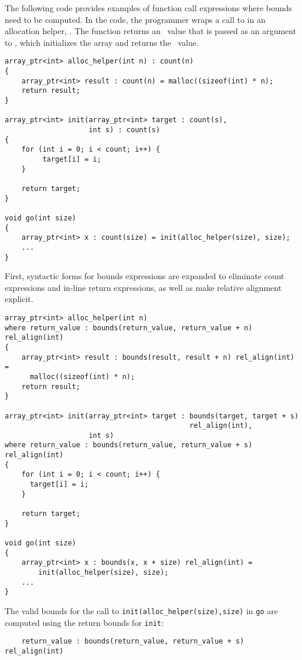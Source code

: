The following code provides examples of function call expressions where
bounds need to be computed. In the code, the programmer wraps a call to
 in an allocation helper, . The
function  returns an \arrayptr\ value
that is passed as an argument to , which initializes the array
and returns the \arrayptr\ value.
\begin{lstlisting}
array_ptr<int> alloc_helper(int n) : count(n)
{
    array_ptr<int> result : count(n) = malloc((sizeof(int) * n);
    return result;
}

array_ptr<int> init(array_ptr<int> target : count(s), 
                    int s) : count(s)
{
    for (int i = 0; i < count; i++) {
         target[i] = i;
    }

    return target;
}

void go(int size) 
{
    array_ptr<int> x : count(size) = init(alloc_helper(size), size);
    ...
}
\end{lstlisting}

First, syntactic forms for bounds expressions are expanded to eliminate
count expressions and in-line return expressions, as well as make
relative alignment explicit.

\begin{lstlisting}
array_ptr<int> alloc_helper(int n)
where return_value : bounds(return_value, return_value + n) rel_align(int)
{
    array_ptr<int> result : bounds(result, result + n) rel_align(int) =
      malloc((sizeof(int) * n);
    return result;
}

array_ptr<int> init(array_ptr<int> target : bounds(target, target + s)
                                            rel_align(int), 
                    int s) 
where return_value : bounds(return_value, return_value + s) rel_align(int)
{
    for (int i = 0; i < count; i++) {
      target[i] = i;
    }

    return target;
}

void go(int size) 
{
    array_ptr<int> x : bounds(x, x + size) rel_align(int) = 
        init(alloc_helper(size), size);
    ...
}
\end{lstlisting}

The valid bounds for the call to \lstinline|init(alloc_helper(size),size)| in
\lstinline|go| are computed using the return bounds for \lstinline|init|:

\begin{lstlisting}
    return_value : bounds(return_value, return_value + s) rel_align(int)
\end{lstlisting}

